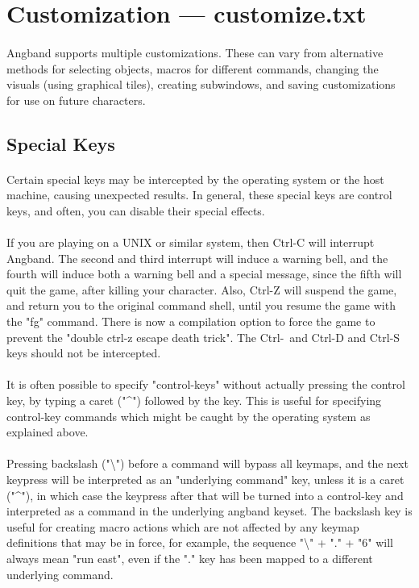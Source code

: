 \section{Customization --- customize.txt}
\paragraph{}Angband supports multiple customizations. These can vary
from alternative methods for selecting objects, macros for different
commands, changing the visuals (using graphical tiles), creating
subwindows, and saving customizations for use on future characters.

\subsection{Special Keys}
\paragraph{}Certain special keys may be intercepted by the operating
system or the host machine, causing unexpected results. In general,
these special keys are control keys, and often, you can disable their
special effects.

\paragraph{}If you are playing on a UNIX or similar system, then Ctrl-C will
interrupt Angband. The second and third interrupt will induce a warning
bell, and the fourth will induce both a warning bell and a special message,
since the fifth will quit the game, after killing your character. Also,
Ctrl-Z will suspend the game, and return you to the original command shell,
until you resume the game with the "fg" command. There is now a compilation
option to force the game to prevent the "double ctrl-z escape death trick".
The Ctrl-\ and Ctrl-D and Ctrl-S keys should not be intercepted.
 
\paragraph{}It is often possible to specify "control-keys" without actually
pressing the control key, by typing a caret ("\^{}") followed by the key.
This is useful for specifying control-key commands which might be caught
by the operating system as explained above.

\paragraph{}Pressing backslash ("\textbackslash ") before a command will bypass all keymaps,
and the next keypress will be interpreted as an "underlying command" key,
unless it is a caret ("\^{}"), in which case the keypress after that will be
turned into a control-key and interpreted as a command in the underlying
angband keyset. The backslash key is useful for creating macro actions
which are not affected by any keymap definitions that may be in force, for
example, the sequence "\textbackslash " + "." + "6" will always mean "run east", even if
the "." key has been mapped to a different underlying command.

